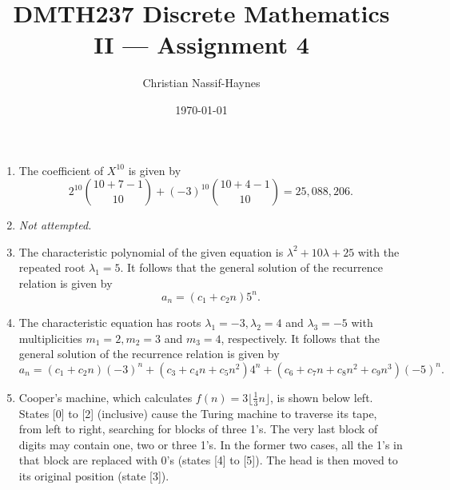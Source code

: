 \documentclass[a4paper,11pt]{article}
\begin{document}
	\title{DMTH237 Discrete Mathematics II --- Assignment 4}
	\author{Christian Nassif-Haynes}
	\date{\today}
	\maketitle
		
	\begin{enumerate}
		\item The coefficient of $X^{10}$ is given by
		\begin{equation*}
			2^{10} \binom{10+7-1}{10} + (-3)^{10} \binom{10+4-1}{10} = 25,088,206.
		\end{equation*}
		
		\item \textit{Not attempted.}
		
		\item The characteristic polynomial of the given equation is $\lambda^2 + 10\lambda + 25$ with the repeated root $\lambda_1 = 5$. It follows that the general
		solution of the recurrence relation is given by
		\begin{equation*}
			a_n = (c_1 + c_2n)5^n.
		\end{equation*}
		
		\item The characteristic equation has roots $\lambda_1 = -3, \lambda_2 = 4$ and $\lambda_3 = -5$ with multiplicities $m_1 = 2, m_2 = 3$ and $m_3 = 4$, respectively. It follows that the general solution of the recurrence relation is given by
		\begin{equation*}
			a_n = (c_1 + c_2 n)(-3)^n + (c_3 + c_4 n + c_5 n^2)4^n + (c_6 + c_7 n + c_8 n^2 + c_9 n^3)(-5)^n.
		\end{equation*}
		
		\item Cooper's machine, which calculates $f(n) = 3 \lfloor \frac{1}{3} n \rfloor$, is shown below left. States [0] to [2] (inclusive) cause the Turing machine to traverse its tape, from left to right, searching for blocks of three 1's. The very last block of digits may contain one, two or three 1's. In the former two cases, all the 1's in that block are replaced with 0's (states [4] to [5]). The head is then moved to its original position (state [3]).
		

\end{enumerate}
\end{document}
